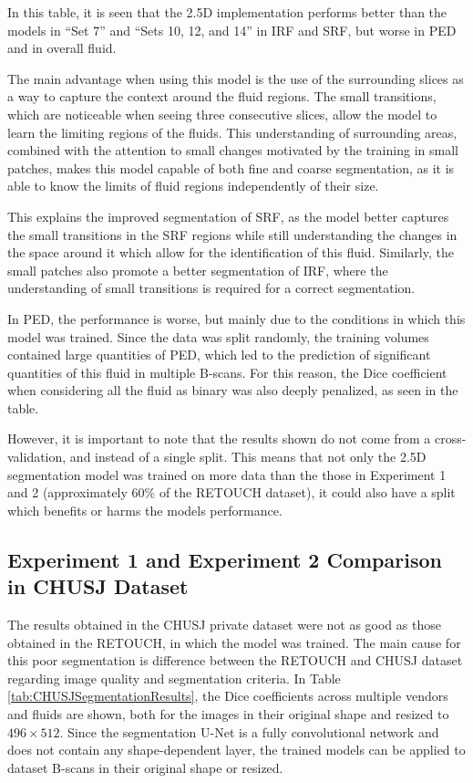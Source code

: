 In this table, it is seen that the 2.5D implementation performs better than the models in ``Set 7'' and ``Sets 10, 12, and 14'' in IRF and SRF, but worse in PED and in overall fluid.
\par
The main advantage when using this model is the use of the surrounding slices as a way to capture the context around the fluid regions. The small transitions, which are noticeable when seeing three consecutive slices, allow the model to learn the limiting regions of the fluids. This understanding of surrounding areas, combined with the attention to small changes motivated by the training in small patches, makes this model capable of both fine and coarse segmentation, as it is able to know the limits of fluid regions independently of their size. 
\par
This explains the improved segmentation of SRF, as the model better captures the small transitions in the SRF regions while still understanding the changes in the space around it which allow for the identification of this fluid. Similarly, the small patches also promote a better segmentation of IRF, where the understanding of small transitions is required for a correct segmentation.
\par
In PED, the performance is worse, but mainly due to the conditions in which this model was trained. Since the data was split randomly, the training volumes contained large quantities of PED, which led to the prediction of significant quantities of this fluid in multiple B-scans. For this reason, the Dice coefficient when considering all the fluid as binary was also deeply penalized, as seen in the table. 
\par
However, it is important to note that the results shown do not come from a cross-validation, and instead of a single split. This means that not only the 2.5D segmentation model was trained on more data than the those in Experiment 1 and 2 (approximately 60\% of the RETOUCH dataset), it could also have a split which benefits or harms the models performance.

\subsection{Experiment 1 and Experiment 2 Comparison in CHUSJ Dataset}

The results obtained in the CHUSJ private dataset were not as good as those obtained in the \hbox{RETOUCH}, in which the model was trained. The main cause for this poor segmentation is difference between the RETOUCH and CHUSJ dataset regarding image quality and segmentation criteria. In Table \ref{tab:CHUSJSegmentationResults}, the Dice coefficients across multiple vendors and fluids are shown, both for the images in their original shape and resized to $496 \times 512$. Since the segmentation U-Net is a fully convolutional network and does not contain any shape-dependent layer, the trained models can be applied to dataset B-scans in their original shape or resized.

